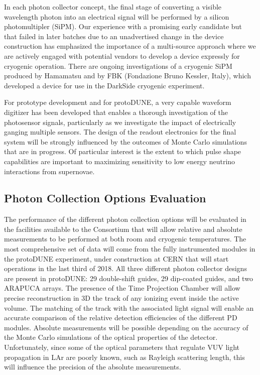 In each photon collector concept, the final stage of converting a visible wavelength photon into an electrical signal will be performed by a silicon photomultipler (SiPM). Our experience with a promising early candidate but that failed in later batches due to an unadvertised change in the device construction has emphasized the importance of a multi-source approach where we are actively engaged with potential vendors to develop a device expressly for cryogenic operation. There are ongoing investigations of a cryogenic SiPM produced by Hamamatsu and by FBK (Fondazione Bruno Kessler, Italy), which developed a device for use in the DarkSide cryogenic experiment.

For prototype development and for protoDUNE, a very capable waveform digitizer has been developed that enables a thorough investigation of the photosensor signals, particularly as we investigate the impact of electrically ganging multiple sensors. The design of the readout electronics for the final system will be strongly influenced by the outcomes of Monte Carlo simulations that are in progress. Of particular interest is the extent to which pulse  shape capabilities are important to maximizing sensitivity to low energy neutrino interactions from supernovae. 


\subsection{Photon Collection Options Evaluation}

The performance of the different photon collection options will be 
evaluated in the facilities available to the Consortium that will allow
relative and absolute measurements to be performed at both room and cryogenic temperatures.
The most comprehensive set of data will come from the fully instrumented modules in the protoDUNE experiment, 
under construction at CERN that will start operations in the last third of 2018.
All  three different photon collector designs are present in protoDUNE: 29 
double-shift guides, 29 dip-coated guides, and two ARAPUCA arrays. The 
presence of the Time Projection Chamber will allow  precise reconstruction
in 3D the track of any ionizing event inside the active volume. The 
matching of the track with the associated light signal will enable an
accurate comparison of the relative detection efficiencies of the different PD 
modules. 
Absolute measurements will be possible depending on the accuracy of the
Monte Carlo simulations of the optical properties of the detector. 
Unfortunately, since some of the optical parameters that 
regulate VUV light propagation in LAr are poorly known, such as Rayleigh 
scattering length, this will influence the precision of the absolute 
measurements. 

